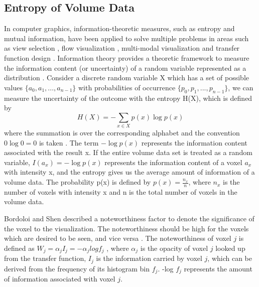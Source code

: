 \subsection{Entropy of Volume Data}
In computer graphics, information-theoretic measures, such as entropy and mutual information, have been applied to solve multiple problems in areas such as view selection \cite{bordoloi_view_2005} 
\cite{bramon_information-theoretic_2013}, flow visualization \cite{xu_information-theoretic_2010}, multi-modal visualization \cite{haidacher_information-based_2008} \cite{bramon_information_2013} and transfer function design \cite{bruckner_isosurface_2010} \cite{ip_hierarchical_2012}.
Information theory provides a theoretic framework to measure the information content (or uncertainty) of a random variable represented as a distribution \cite{wang_information_2011}.
Consider a discrete random variable X which has a set of possible values $\{a_{0},a_{1},...,a_{n-1} \}$ with probabilities of occurrence $\{ p_{0},p_{1},...,p_{n-1} \}$, we can measure the uncertainty of the outcome with the entropy H(X), which is defined by
\[  H(X)=-\sum_{x \in X} p(x) \log p(x) \]
where the summation is over the corresponding alphabet and the convention $ 0\log 0=0 $ is taken%
.
The term $ -\log p(x) $ represents the information content associated with the result x.
If the entire volume data set is treated as a random variable, $ I(a_{x})=-\log p(x) $ represents the information content of a voxel $ a_{x} $ with intensity x, and the entropy gives us the average amount of information of a volume data.
The probability p(x) is defined by
$ p(x)=\frac{n_{x}}{n} $, where $ n_{x} $ is the number of voxels with intensity x and n is the total number of voxels in the volume data.




Bordoloi and Shen \cite{bordoloi_view_2005} described a noteworthiness factor to denote the significance of the voxel to the visualization.
The noteworthiness should be high for the voxels which are desired to be seen, and vice versa . The noteworthiness of voxel $ j $ is defined as
$ W_{j}=\alpha_{j}I_{j}=-\alpha_{j}logf_{j} $
, where $ \alpha_{j} $ is the opacity of voxel $ j $ looked up from the transfer function, $ I_{j} $ is the information carried by voxel $ j $, which can be derived from the frequency of its histogram bin $ f_{j} $. -log $ f_{j} $ represents the amount of information associated with voxel $ j $.

